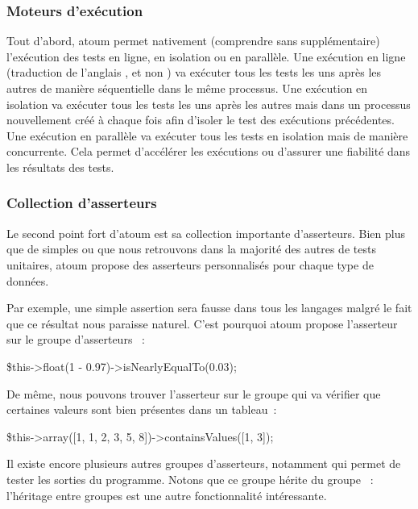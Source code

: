 \subsubsection{Moteurs d'exécution}

Tout d'abord, atoum permet nativement (comprendre sans 
supplémentaire) l'exécution des tests en ligne, en isolation ou en parallèle.
Une exécution en ligne (traduction de l'anglais , et non
) va exécuter tous les tests les uns après les autres de
manière séquentielle dans le même processus. Une exécution en isolation va
exécuter tous les tests les uns après les autres mais dans un processus
nouvellement créé à chaque fois afin d'isoler le test des exécutions
précédentes. Une exécution en parallèle va exécuter tous les tests en isolation
mais de manière concurrente. Cela permet d'accélérer les exécutions ou d'assurer
une fiabilité dans les résultats des tests.

\subsubsection{Collection d'asserteurs}

Le second point fort d'atoum est sa collection importante d'asserteurs. Bien
plus que de simples  ou  que nous retrouvons
dans la majorité des autres  de tests unitaires, atoum
propose des asserteurs personnalisés pour chaque type de données.

\begin{example}

Par exemple, une simple assertion  sera fausse dans tous
les langages malgré le fait que ce résultat nous paraisse naturel. C'est
pourquoi atoum propose l'asserteur  sur le groupe
d'asserteurs ~:
%
\begin{pre}
\$this->float(1 - 0.97)->isNearlyEqualTo(0.03);
\end{pre}
%
De même, nous pouvons trouver l'asserteur  sur le groupe
 qui va vérifier que certaines valeurs sont bien présentes dans un
tableau~:
%
\begin{pre}
\$this->array([1, 1, 2, 3, 5, 8])->containsValues([1, 3]);
\end{pre}
%
Il existe encore plusieurs autres groupes d'asserteurs, notamment 
qui permet de tester les sorties du programme. Notons que ce groupe hérite du
groupe ~: l'héritage entre groupes est une autre fonctionnalité
intéressante.

\end{example}

